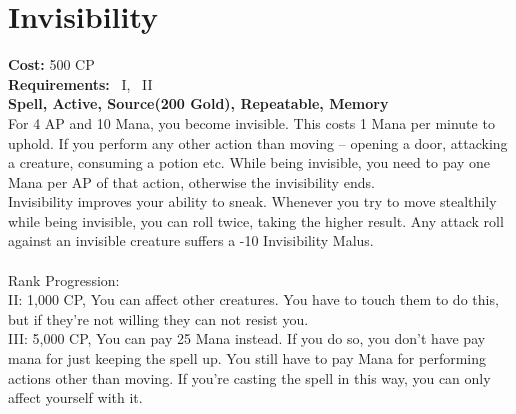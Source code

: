 \section{Invisibility}\label{spell:invisibility}
\textbf{Cost:} 500 CP\\
\textbf{Requirements:}~ I,~ II\\
\textbf{Spell, Active, Source(200 Gold), Repeatable, Memory}\\
For 4 AP and 10 Mana, you become invisible.
This costs 1 Mana per minute to uphold.
If you perform any other action than moving -- opening a door, attacking a creature, consuming a potion etc.
While being invisible, you need to pay one Mana per AP of that action, otherwise the invisibility ends.\\
Invisibility improves your ability to sneak.
Whenever you try to move stealthily while being invisible, you can roll twice, taking the higher result.
Any attack roll against an invisible creature suffers a -10 Invisibility Malus.\\
\\
Rank Progression:\\
II: 1,000 CP, You can affect other creatures.
You have to touch them to do this, but if they're not willing they can not resist you.\\

III: 5,000 CP, You can pay 25 Mana instead.
If you do so, you don't have pay mana for just keeping the spell up.
You still have to pay Mana for performing actions other than moving.
If you're casting the spell in this way, you can only affect yourself with it.\\